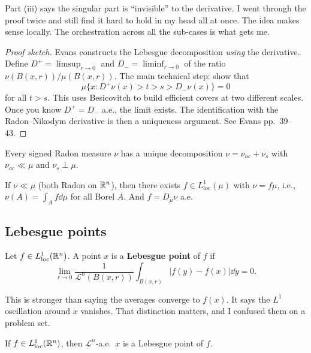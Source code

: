 Part (iii) says the singular part is ``invisible'' to the derivative.
I went through the proof twice and still find it hard to hold in my head all at once. The idea makes sense locally. The orchestration across all the sub-cases is what gets me.

\begin{proof}[Proof sketch]
Evans constructs the Lebesgue decomposition \emph{using} the derivative.
Define $D^+ = \limsup_{r \to 0}$ and $D_- = \liminf_{r \to 0}$ of the
ratio $\nu(B(x,r))/\mu(B(x,r))$. The main technical step: show that
\[
  \mu\{x : D^+ \nu(x) > t > s > D_- \nu(x)\} = 0
\]
for all $t > s$. This uses Besicovitch to build efficient covers at two
different scales. Once you know $D^+ = D_-$ a.e., the limit exists. The
identification with the Radon--Nikodym derivative is then a uniqueness
argument. See Evans pp.\ 39--43. \qedhere
\end{proof}

\begin{corollary}\label{cor:lebesgue-decomp}
Every signed Radon measure $\nu$ has a unique decomposition
$\nu = \nu_{ac} + \nu_s$ with $\nu_{ac} \ll \mu$ and $\nu_s \perp \mu$.
\end{corollary}

\begin{corollary}\label{cor:radon-nikodym}
If $\nu \ll \mu$ (both Radon on $\mathbb{R}^n$), then there exists
$f \in L^1_{\mathrm{loc}}(\mu)$ with $\nu = f\mu$, i.e.,
$\nu(A) = \int_A f \dd\mu$ for all Borel $A$. And $f = D_\mu \nu$
a.e.
\end{corollary}


\subsection{Lebesgue points}\label{subsec:lebesgue-pts}

\begin{definition}\label{def:lebesgue-point}
Let $f \in L^1_{\mathrm{loc}}(\mathbb{R}^n)$. A point $x$ is a
\textbf{Lebesgue point} of $f$ if
\[
  \lim_{r \to 0} \frac{1}{\mathcal{L}^n(B(x,r))}
    \int_{B(x,r)} |f(y) - f(x)| \dd y = 0.
\]
\end{definition}

This is stronger than saying the averages converge to $f(x)$. It says
the $L^1$ oscillation around $x$ vanishes. That distinction matters, and I confused them on a problem set.

\begin{theorem}\label{thm:lebesgue-points}
If $f \in L^1_{\mathrm{loc}}(\mathbb{R}^n)$, then $\mathcal{L}^n$-a.e.\ $x$ is
a Lebesgue point of $f$.
\end{theorem}

